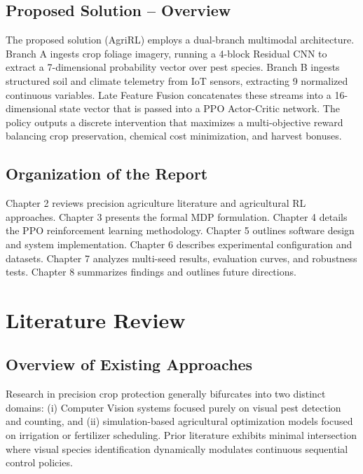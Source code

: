 \documentclass[12pt,a4paper]{report}
\begin{document}
\section{Proposed Solution – Overview}
The proposed solution (AgriRL) employs a dual-branch multimodal architecture. Branch A ingests crop foliage imagery, running a 4-block Residual CNN to extract a 7-dimensional probability vector over pest species. Branch B ingests structured soil and climate telemetry from IoT sensors, extracting 9 normalized continuous variables. Late Feature Fusion concatenates these streams into a 16-dimensional state vector that is passed into a PPO Actor-Critic network. The policy outputs a discrete intervention that maximizes a multi-objective reward balancing crop preservation, chemical cost minimization, and harvest bonuses.

\section{Organization of the Report}
Chapter 2 reviews precision agriculture literature and agricultural RL approaches. Chapter 3 presents the formal MDP formulation. Chapter 4 details the PPO reinforcement learning methodology. Chapter 5 outlines software design and system implementation. Chapter 6 describes experimental configuration and datasets. Chapter 7 analyzes multi-seed results, evaluation curves, and robustness tests. Chapter 8 summarizes findings and outlines future directions.

\chapter{Literature Review}

\section{Overview of Existing Approaches}
Research in precision crop protection generally bifurcates into two distinct domains: (i) Computer Vision systems focused purely on visual pest detection and counting, and (ii) simulation-based agricultural optimization models focused on irrigation or fertilizer scheduling. Prior literature exhibits minimal intersection where visual species identification dynamically modulates continuous sequential control policies.
\end{document}
